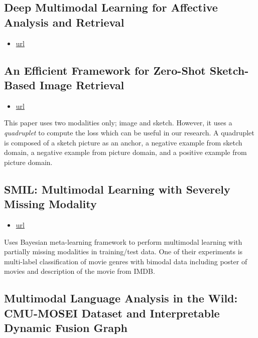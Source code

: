 \subsection{Deep Multimodal Learning for Affective Analysis and Retrieval}

\begin{itemize}
\item \href{https://ieeexplore.ieee.org/abstract/document/7277066?casa\_token=aBp6BxcszHwAAAAA:3NoMiFrZbn7tXfavF1rgkCiGWbFI2arxn8Xb6iDF79q4zBZHWi7PWWhf6xW-xJwYdFALbmRENo4}{url}
\end{itemize}

\subsection{An Efficient Framework for Zero-Shot Sketch-Based Image Retrieval}

\begin{itemize}
\item \href{https://arxiv.org/pdf/2102.04016.pdf}{url}
\end{itemize}
This paper uses two modalities only; image and sketch. However, it uses a \textit{quadruplet} to compute the loss which can be useful in our research. A quadruplet is composed of a sketch picture as an anchor, a negative example from sketch domain, a negative example from picture domain, and a positive example from picture domain.

\subsection{SMIL: Multimodal Learning with Severely Missing Modality}

\begin{itemize}
\item \href{https://www.aaai.org/AAAI21Papers/AAAI-437.MaM.pdf}{url}
\end{itemize}
Uses Bayesian meta-learning framework to perform multimodal learning with partially missing modalities in training/test data.
One of their experiments is multi-label classification of movie genres with bimodal data including poster of movies and description of the movie from IMDB.

\subsection{Multimodal Language Analysis in the Wild: CMU-MOSEI Dataset and Interpretable Dynamic Fusion Graph}

